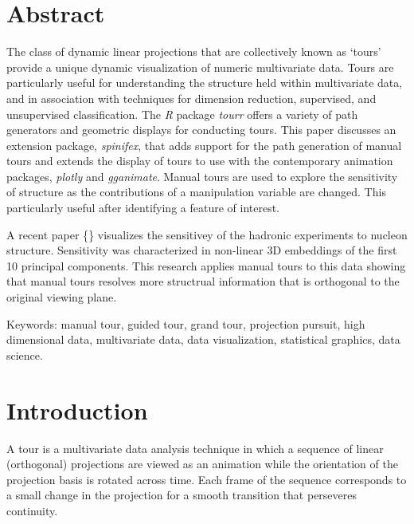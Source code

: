 \documentclass{monashthesis}
\begin{document}
\hypertarget{abstract-1}{%
\section{Abstract}\label{abstract-1}}

The class of dynamic linear projections that are collectively known as `tours' provide a unique dynamic visualization of numeric multivariate data. Tours are particularly useful for understanding the structure held within multivariate data, and in association with techniques for dimension reduction, supervised, and unsupervised classification. The \emph{R} package \emph{tourr} offers a variety of path generators and geometric displays for conducting tours. This paper discusses an extension package, \emph{spinifex}, that adds support for the path generation of manual tours and extends the display of tours to use with the contemporary animation packages, \emph{plotly} and \emph{gganimate}. Manual tours are used to explore the sensitivity of structure as the contributions of a manipulation variable are changed. This particularly useful after identifying a feature of interest.

A recent paper \{\textcite{wang_mapping_2018}\} visualizes the sensitivey of the hadronic experiments to nucleon structure. Sensitivity was characterized in non-linear 3D embeddings of the first 10 principal components. This research applies manual tours to this data showing that manual tours resolves more structrual information that is orthogonal to the original viewing plane.

Keywords: manual tour, guided tour, grand tour, projection pursuit, high dimensional data, multivariate data, data visualization, statistical graphics, data science.

\hypertarget{introduction}{%
\section{Introduction}\label{introduction}}

A tour is a multivariate data analysis technique in which a sequence of linear (orthogonal) projections are viewed as an animation while the orientation of the projection basis is rotated across time. Each frame of the sequence corresponds to a small change in the projection for a smooth transition that perseveres continuity.
\end{document}
